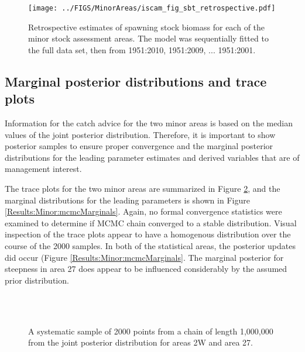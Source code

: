 \begin{figure}[!tbp]
	\texttt{[image: ../FIGS/MinorAreas/iscam\_fig\_sbt\_retrospective.pdf]}\\
	\caption{Retrospective estimates of spawning stock biomass for each of the minor stock assessment areas.  The model was sequentially fitted to the full data set, then from 1951:2010, 1951:2009, ... 1951:2001.}\label{fig:Results:Minor:retrospective}
\end{figure}

\subsection{Marginal posterior distributions and trace plots}

Information for the catch advice for the two minor areas is based on the median values of the joint posterior distribution.  Therefore, it is important to show posterior samples to ensure proper convergence and the marginal posterior distributions for the leading parameter estimates and derived variables  that are of management interest.

 The trace plots for the two minor areas are summarized in Figure \ref{Results:Minor:mcmcTrace}, and the marginal distributions for the leading parameters is shown in Figure \ref{Results:Minor:mcmcMarginals}.  Again, no formal convergence statistics were examined to determine if MCMC chain converged to a stable distribution.  Visual inspection of the trace plots appear to have a homogenous distribution over the course of the 2000 samples.  In both of the statistical areas, the posterior updates did occur (Figure \ref{Results:Minor:mcmcMarginals}.  The marginal posterior for steepness in area 27 does appear to be influenced considerably by the assumed prior distribution.
 
 \begin{figure}[!tbp]
	\centering
	\\
	\\
	\caption{A systematic sample of 2000 points from a chain of length 1,000,000 from the joint posterior distribution for areas 2W and area 27. }\label{Results:Minor:mcmcTrace}
\end{figure}

